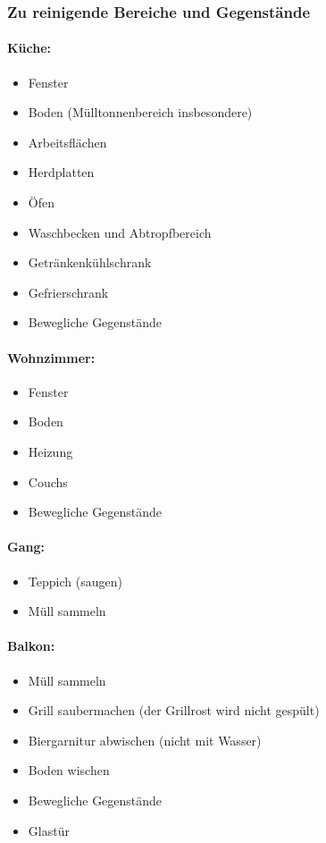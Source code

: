 \documentclass[10pt,a4paper,final]{article}
\begin{document}
\subsubsection{Zu reinigende Bereiche und Gegenstände}
\paragraph{Küche:}
\begin{itemize}
\item Fenster
\item Boden (Mülltonnenbereich insbesondere)
\item Arbeitsflächen
\item Herdplatten
\item Öfen
\item Waschbecken und Abtropfbereich
\item Getränkenkühlschrank
\item Gefrierschrank
\item Bewegliche Gegenstände
\end{itemize}

\paragraph{Wohnzimmer:}
\begin{itemize}
\item Fenster
\item Boden
\item Heizung
\item Couchs
\item Bewegliche Gegenstände

\end{itemize}

\paragraph{Gang:}
\begin{itemize}
\item Teppich (saugen)
\item Müll sammeln

\end{itemize}
\paragraph{Balkon:}
\begin{itemize}
\item Müll sammeln
\item Grill saubermachen (der Grillrost wird nicht gespült)
\item Biergarnitur abwischen (nicht mit Wasser)
\item Boden wischen
\item Bewegliche Gegenstände
\item Glastür
\end{itemize}
\end{document}
